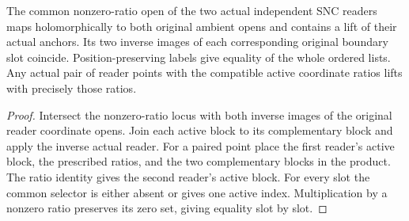 \begin{theorem}
\label{hir:g1-actual-relative-reader-window}
\leanok
The common nonzero-ratio open of the two actual independent
SNC readers maps holomorphically to both original ambient opens
and contains a lift of their actual anchors. Its two inverse
images of each corresponding original boundary slot coincide.
Position-preserving labels give equality of the whole ordered
lists. Any actual pair of reader points with the compatible
active coordinate ratios lifts with precisely those ratios.
\end{theorem}
\begin{proof}
Intersect the nonzero-ratio locus with both inverse images of
the original reader coordinate opens. Join each active block
to its complementary block and apply the inverse actual reader.
For a paired point place the first reader's active block, the
prescribed ratios, and the two complementary blocks in the
product. The ratio identity gives the second reader's active
block. For every slot the common selector is either absent or
gives one active index. Multiplication by a nonzero ratio
preserves its zero set, giving equality slot by slot.
\end{proof}


